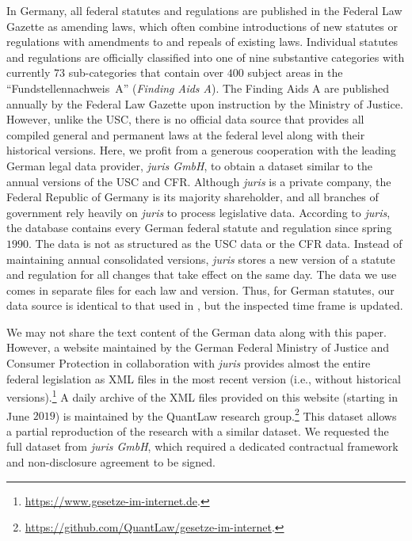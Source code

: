 \documentclass[utf8,sort&compress,numbers,square,table,hidelinks]{frontiers_suppmat} %
\begin{document}
In Germany,
all federal statutes and regulations are published in the Federal Law Gazette as amending laws,
which often combine introductions of new statutes or regulations with amendments to and repeals of existing laws.
Individual statutes and regulations are officially classified into one of nine substantive categories with currently $73$ sub-categories that contain over $400$ subject areas in the ``Fundstellennachweis~A'' (\emph{Finding Aids A}).
The Finding Aids A are published annually by the Federal Law Gazette upon instruction by the Ministry of Justice.
However, unlike the USC, there is no official data source that provides all compiled general and permanent laws at the federal level along with their historical versions.
Here, we profit from a generous cooperation with the leading German legal data provider, \emph{juris GmbH}, 
to obtain a dataset similar to the annual versions of the USC and CFR. 
Although \emph{juris} is a private company, 
the Federal Republic of Germany is its majority shareholder, 
and all branches of government rely heavily on \emph{juris} to process legislative data. 
According to \emph{juris}, the database contains every German federal statute and regulation since spring $1990$.
The data is not as structured as the USC data or the CFR data.
Instead of maintaining annual consolidated versions,
\emph{juris} stores a new version of a statute and regulation for all changes that take effect on the same day.
The data we use comes in separate files for each law and version.
Thus, for German statutes, our data source is identical to that used in \cite{katz2020},
but the inspected time frame is updated.

We may not share the text content of the German data along with this paper.
However, a website maintained by the German Federal Ministry of Justice and Consumer Protection in collaboration with \emph{juris}
provides almost the entire federal legislation as XML files in the most recent version (i.e., without historical versions).\footnote{\url{https://www.gesetze-im-internet.de}.}
A daily archive of the XML files provided on this website (starting in June $2019$) is maintained by the QuantLaw research group.\footnote{\url{https://github.com/QuantLaw/gesetze-im-internet}.}
This dataset allows a partial reproduction of the research with a similar dataset.
We requested the full dataset from \emph{juris GmbH}, 
which required a dedicated contractual framework and non-disclosure agreement to be signed.

\clearpage

\vspace*{6pt}
\end{document}
